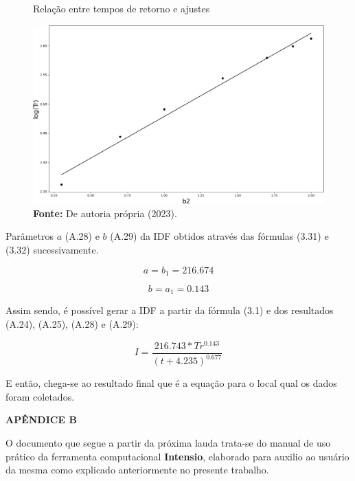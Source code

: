 \begin{figure}[!ht]
	\centering
	\caption{Relação entre tempos de retorno e ajustes}
	\includegraphics[width=.7325\linewidth]{figuras/apendice_reta_de_tempo_de_retorno.png}
	\caption*{\textbf{Fonte:} De autoria própria (2023).}
	\label{fig:apendice_reta_de_tempo_de_retorno.png}
\end{figure}

\newpage

Parâmetros $a$ (A.28) e $b$ (A.29) da IDF obtidos através das fórmulas (3.31) e (3.32) sucessivamente.\bigskip

\begin{equation}
a = b_1 = 216.674
\end{equation}

\begin{equation}
b = a_1 = 0.143
\end{equation}\bigskip

Assim sendo, é possível gerar a IDF a partir da fórmula (3.1) e dos resultados (A.24), (A.25), (A.28) e (A.29):\bigskip

\begin{equation}
I = \frac{216.743 * Tr^{0.143}}{(t + 4.235)^{0.677}}
\end{equation}\bigskip

E então, chega-se ao resultado final que é a equação para o local qual os dados foram coletados.\bigskip\bigskip


\begin{center}
\noindent\textbf{APÊNDICE B}
\end{center}

O documento que segue a partir da próxima lauda trata-se do manual de uso prático da ferramenta computacional \textbf{Intensio}, elaborado para auxilio ao usuário da mesma como explicado anteriormente no presente trabalho.


